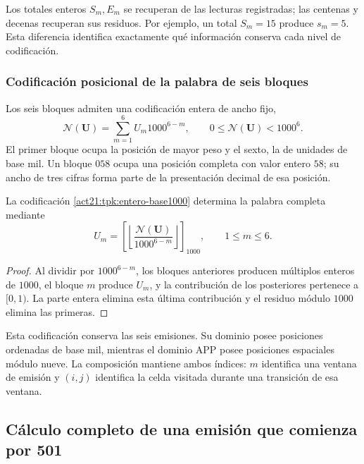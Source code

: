 Los totales enteros \(S_m,E_m\) se recuperan de las lecturas registradas;
las centenas y decenas recuperan sus residuos. Por ejemplo, un total
\(S_m=15\) produce \(s_m=5\). Esta diferencia identifica exactamente
qué información conserva cada nivel de codificación.



\subsubsection{Codificación posicional de la palabra de seis bloques}

Los seis bloques admiten una codificación entera de ancho fijo,
\begin{equation}
 \mathscr N(\mathbf U)=\sum_{m=1}^{6}U_m1000^{6-m},
 \qquad0\leq\mathscr N(\mathbf U)<1000^6.
 \label{act21:tpk:entero-base1000}
\end{equation}
El primer bloque ocupa la posición de mayor peso y el sexto, la de unidades
de base mil. Un bloque \(058\) ocupa una posición completa con valor
entero \(58\); su ancho de tres cifras forma parte de la presentación
decimal de esa posición.

\begin{proposition}
\label{act21:tpk:inversa-base1000}
La codificación \eqref{act21:tpk:entero-base1000} determina la palabra completa
mediante
\[
 U_m=\left[\left\lfloor
 \frac{\mathscr N(\mathbf U)}{1000^{6-m}}\right\rfloor\right]_{1000},
 \qquad1\leq m\leq6.
\]
\end{proposition}
\begin{proof}
Al dividir por \(1000^{6-m}\), los bloques anteriores producen múltiplos
enteros de \(1000\), el bloque \(m\) produce \(U_m\), y la contribución
de los posteriores pertenece a \([0,1)\). La parte entera elimina esta
última contribución y el residuo módulo \(1000\) elimina las primeras.
\end{proof}

Esta codificación conserva las seis emisiones. Su dominio posee posiciones
ordenadas de base mil, mientras el dominio APP posee posiciones espaciales
módulo nueve. La composición mantiene ambos índices: \(m\) identifica una
ventana de emisión y \((i,j)\) identifica la celda visitada durante una
transición de esa ventana.

\subsection{Cálculo completo de una emisión que comienza por 501}
\label{act21:tpk:ejemplo501}

